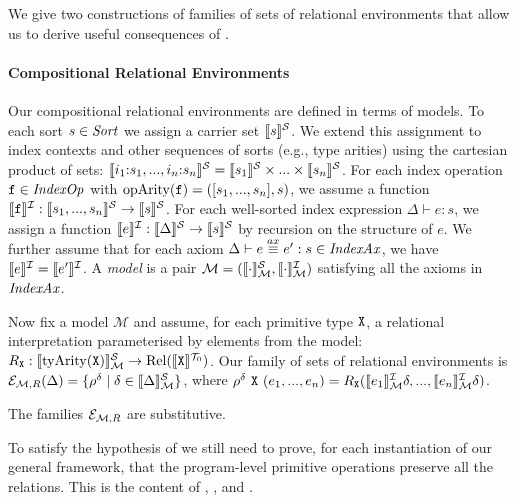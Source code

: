 We give two constructions of families of sets of relational
environments that allow us to derive useful consequences of
.

\paragraph{Compositional Relational Environments}
Our compositional relational environments are defined in terms of
models. To each sort $s \in \mathit{Sort}$ we assign a carrier set
$\llbracket s \rrbracket^{\mathcal{S}}$. We extend this assignment to index contexts and other
sequences of sorts (e.g., type arities) using the cartesian product of
sets: $\llbracket i_1\mathord:s_1,...,i_n\mathord:s_n \rrbracket^{\mathcal{S}} = \llbracket s_1 \rrbracket^{\mathcal{S}}
\times ... \times \llbracket s_n \rrbracket^{\mathcal{S}}$. For each index operation $\texttt{f}
\in \mathit{IndexOp}$ with $\mathrm{opArity}(\texttt{f}) = ([s_1,...,s_n],s)$,
we assume a function $\llbracket \texttt{f} \rrbracket^{\mathcal{I}} : \llbracket s_1,...,s_n \rrbracket^{\mathcal{S}}
\to \llbracket s \rrbracket^{\mathcal{S}}$. For each well-sorted index expression $\Delta \vdash
e : s$, we assign a function $\llbracket e \rrbracket^{\mathcal{I}} : \llbracket \Delta \rrbracket^{\mathcal{S}} \to
\llbracket s \rrbracket^{\mathcal{S}}$ by recursion on the structure of $e$. We further assume
that for each axiom $\Delta \vdash e \stackrel{ax}\equiv e' : s \in
\mathit{IndexAx}$, we have $\llbracket e \rrbracket^{\mathcal{I}} = \llbracket e' \rrbracket^{\mathcal{I}}$. A
\emph{model} is a pair $\mathcal{M} = (\llbracket \cdot \rrbracket^{\mathcal{S}}_{\mathcal{M}},
\llbracket \cdot \rrbracket^{\mathcal{I}}_{\mathcal{M}})$ satisfying all the axioms in
$\mathit{IndexAx}$.

Now fix a model $\mathcal{M}$ and assume, for each primitive type
$\textup{\texttt{X}}$, a relational interpretation parameterised by elements
from the model: $R_{\textup{\texttt{X}}} :
\llbracket \mathrm{tyArity}(\textup{\texttt{X}}) \rrbracket^{\mathcal{S}}_{\mathcal{M}} \to
\mathrm{Rel}(\llbracket \textup{\texttt{X}} \rrbracket^{\mathcal{T}_0})$. Our family of sets of relational
environments is $\mathcal{E}_{\mathcal{M},R}(\Delta) = \{ \rho^\delta
\mathrel| \delta \in \llbracket \Delta \rrbracket^{\mathcal{S}}_{\mathcal{M}} \}$, where
$\rho^\delta\ \textup{\texttt{X}}\ (e_1,...,e_n) =
R_{\textup{\texttt{X}}}(\llbracket e_1 \rrbracket^{\mathcal{I}}_{\mathcal{M}}\delta, ...,
\llbracket e_n \rrbracket^{\mathcal{I}}_{\mathcal{M}}\delta)$.

\begin{theorem}
  The families $\mathcal{E}_{\mathcal{M},R}$ are substitutive.
\end{theorem}

To satisfy the hypothesis of  we still need to
prove, for each instantiation of our general framework, that the
program-level primitive operations preserve all the relations. This is
the content of ,
,
 and
.

